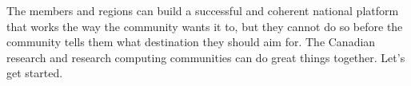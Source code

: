 \documentclass[11pt, letterpaper, twoside]{article}
\begin{document}
The members and regions can build a successful and coherent national
platform that works the way the community wants it to, but they cannot
do so before the community tells them what destination they should aim
for. The Canadian research and research computing communities can do
great things together. Let's get started.

\newpage


%


\clearpage

\makebackcover
\end{document}
